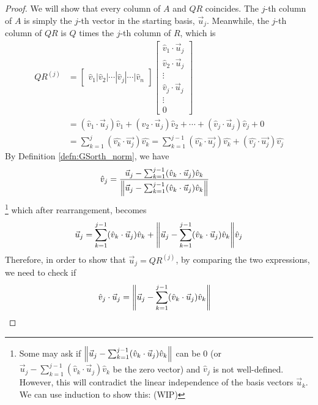 \begin{proof}
We will show that every column of $A$ and $QR$ coincides. The $j$-th column of $A$ is simply the $j$-th vector in the starting basis, $\vec{u}_j$. Meanwhile, the $j$-th column of $QR$ is $Q$ times the $j$-th column of $R$, which is
\begin{align*}
QR^{(j)} &=
\begin{bmatrix}
\hat{v}_1|\hat{v}_2|\cdots|\hat{v}_j|\cdots|\hat{v}_n   
\end{bmatrix}
\begin{bmatrix}
\hat{v}_1 \cdot \vec{u}_j \\   
\hat{v}_2 \cdot \vec{u}_j \\   
\vdots \\
\hat{v}_j \cdot \vec{u}_j \\
\vdots \\
0
\end{bmatrix} \\
&= (\hat{v}_1 \cdot \vec{u}_j) \hat{v}_1 + (\hat{v}_2 \cdot \vec{u}_j) \hat{v}_2 + \cdots + (\hat{v}_j \cdot \vec{u}_j) \hat{v}_j + 0 \\
&= \sum_{k=1}^{j}(\hat{v_k} \cdot \vec{u_j})\hat{v_k} = \sum_{k=1}^{j-1}(\hat{v_k} \cdot \vec{u_j})\hat{v_k} + (\hat{v_j} \cdot \vec{u_j})\hat{v_j}
\end{align*}
By Definition \ref{defn:GSorth_norm}, we have
\begin{align*}
\hat{v}_j &= \frac{\vec{u}_j - \sum_{k=1}^{j-1}(\hat{v}_k \cdot \vec{u}_j)\hat{v}_k}{\norm{\vec{u}_j - \sum_{k=1}^{j-1}(\hat{v}_k \cdot \vec{u}_j)\hat{v}_k}}
\end{align*}
\footnote{\label{foot:GSnonzero} Some may ask if $\norm{\vec{u}_j - \sum_{k=1}^{j-1}(\hat{v}_k \cdot \vec{u}_j)\hat{v}_k}$ can be $0$ (or $\vec{u}_j - \sum_{k=1}^{j-1}(\hat{v}_k \cdot \vec{u}_j)\hat{v}_k$ be the zero vector) and $\hat{v}_j$ is not well-defined. However, this will contradict the linear independence of the basis vectors $\vec{u}_k$. We can use induction to show this: (WIP)} which after rearrangement, becomes
\begin{align*}
\vec{u}_j = \sum_{k=1}^{j-1}(\hat{v}_k \cdot \vec{u}_j)\hat{v}_k + {\norm{\vec{u}_j - \sum_{k=1}^{j-1}(\hat{v}_k \cdot \vec{u}_j)\hat{v}_k}}\hat{v}_j
\end{align*}
Therefore, in order to show that $\vec{u}_j = QR^{(j)}$, by comparing the two expressions, we need to check if
\begin{align*}
\hat{v}_j \cdot \vec{u}_j &= {\norm{\vec{u}_j - \sum_{k=1}^{j-1}(\hat{v}_k \cdot \vec{u}_j)\hat{v}_k}} 

\end{align*}
\end{proof}
